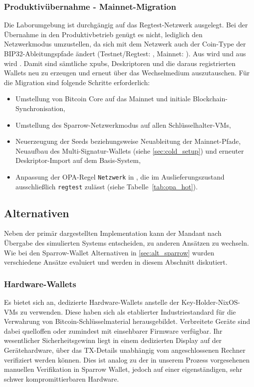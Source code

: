 \subsubsection{Produktivübernahme - Mainnet-Migration} \label{sec:mainnet_migration}
Die Laborumgebung ist durchgängig auf das Regtest-Netzwerk ausgelegt. Bei der Übernahme in den Produktivbetrieb genügt es nicht, lediglich den Netzwerkmodus umzustellen, da sich mit dem Netzwerk auch der Coin-Type der \ac{BIP}32-Ableitungspfade ändert (Testnet/Regtest: , Mainnet: ). 
Aus  wird  und aus  wird . Damit sind sämtliche \acp{xpub}, Deskriptoren und die daraus registrierten Wallets neu zu erzeugen und erneut über das Wechselmedium auszutauschen. Für die Migration sind
folgende Schritte erforderlich:
\begin{itemize}
    \item Umstellung von Bitcoin Core auf das Mainnet und initiale
          Blockchain-Synchronisation,
    \item Umstellung des Sparrow-Netzwerkmodus auf allen Schlüsselhalter-\acp{VM},
    \item Neuerzeugung der Seeds beziehungsweise Neuableitung der Mainnet-Pfade,
          Neuaufbau des Multi-Signatur-Wallets (siehe \ref{sec:cold_setup}) und
          erneuter Deskriptor-Import auf dem Basis-System,
    \item Anpassung der \ac{OPA}-Regel \texttt{Netzwerk} in ,
          die im Auslieferungszustand ausschließlich \texttt{regtest} zulässt
          (siehe Tabelle~\ref{tab:opa_hot}).
\end{itemize}

\subsection{Alternativen} \label{sec:alt_alg}
Neben der primär dargestellten Implementation kann der Mandant nach Übergabe des simulierten Systems entscheiden, zu anderen Ansätzen zu wechseln. Wie bei den Sparrow-Wallet Alternativen in \ref{sec:alt_sparrow} wurden verschiedene Ansätze evaluiert und werden in diesem Abschnitt diskutiert.

\subsubsection{Hardware-Wallets}
Es bietet sich an, dedizierte Hardware-Wallets anstelle der Key-Holder-NixOS-\acp{VM} zu verwenden. Diese haben sich als etablierter Industriestandard für die Verwahrung von Bitcoin-Schlüsselmaterial
herausgebildet. Verbreitete Geräte sind dabei quelloffen oder zumindest mit einsehbarer Firmware verfügbar. Ihr wesentlicher Sicherheitsgewinn liegt in einem dedizierten Display auf der Gerätehardware, über das \ac{TX}-Details unabhängig vom angeschlossenen Rechner verifiziert werden können. Dies ist analog zu der in unserem Prozess vorgesehenen manuellen Verifikation in Sparrow Wallet,
jedoch auf einer eigenständigen, sehr schwer kompromittierbaren Hardware.

